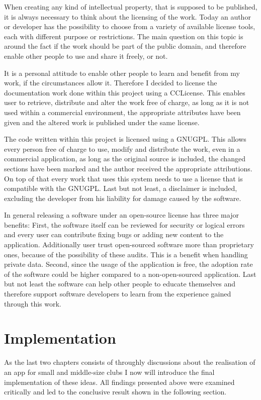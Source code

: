 When creating any kind of intellectual property, that is supposed to be published, it is always necessary to think about the licensing of the work. Today an author or developer has the possibility to choose from a variety of available license tools, each with different purpose or restrictions. The main question on this topic is around the fact if the work should be part of the public domain, and therefore enable other people to use and share it freely, or not. 

It is a personal attitude to enable other people to learn and benefit from my work, if the circumstances allow it. Therefore I decided to license the documentation work done within this project using a \gls{CCLicense}. This enables user to retrieve, distribute and alter the work free of charge, as long as it is not used within a commercial environment, the appropriate attributes have been given and the altered work is published under the same license. \cite{Commons:2015aa}

The code written within this project is licensed using a \gls{GNUGPL}. This allows every person free of charge to use, modify and distribute the work, even in a commercial application, as long as the original source is included, the changed sections have been marked and the author received the appropriate attributions. On top of that every work that uses this system needs to use a license that is compatible with the \gls{GNUGPL}. Last but not least, a disclaimer is included, excluding the developer from his liability for damage caused by the software. \cite{Foundation:1991aa}

In general releasing a software under an open-source license has three major benefits: First, the software itself can be reviewed for security or logical errors and every user can contribute fixing bugs or adding new content to the application. Additionally user trust open-sourced software more than proprietary ones, because of the possibility of these audits. This is a benefit when handling private data. Second, since the usage of the application is free, the adoption rate of the software could be higher compared to a non-open-sourced application. Last but not least the software can help other people to educate themselves and therefore support software developers to learn from the experience gained through this work.

\chapter{Implementation}
\label{chapter:Implementation}
As the last two chapters consists of throughly discussions about the realisation of an app for small and middle-size clubs I now will introduce the final implementation of these ideas. All findings presented above were examined critically and led to the conclusive result shown in the following section.


